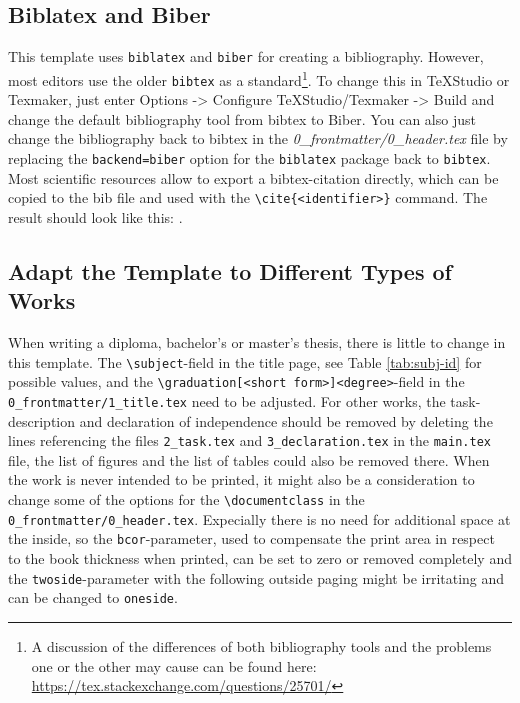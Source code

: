 \subsection{Biblatex and Biber}
This template uses \texttt{biblatex} and \texttt{biber} for creating a bibliography. However, most editors use the older \texttt{bibtex} as a standard\footnote{A discussion of the differences of both bibliography tools and the problems one or the other may cause can be found here: \url{https://tex.stackexchange.com/questions/25701/}}. To change this in TeXStudio or Texmaker, just enter Options -> Configure TeXStudio/Texmaker -> Build and change the default bibliography tool from bibtex to Biber. You can also just change the bibliography back to bibtex in the \emph{0\_frontmatter/0\_header.tex} file by replacing the \texttt{backend=biber} option for the \texttt{biblatex} package back to \texttt{bibtex}.
Most scientific resources allow to export a bibtex-citation directly, which can be copied to the bib file and used with the \texttt{\textbackslash cite\{<identifier>\}} command. The result should look like this: \cite{Foley1982}.

\subsection{Adapt the Template to Different Types of Works}
When writing a diploma, bachelor's or master's thesis, there is little to change in this template. The \texttt{\textbackslash{}subject{}}-field in the title page, see Table \ref{tab:subj-id} for possible values, and the \texttt{\textbackslash{}graduation[<short form>]{<degree>}}-field in the \texttt{0\_frontmatter/1\_title.tex} need to be adjusted. For other works, the task-description and declaration of independence should be removed by deleting the lines referencing the files \texttt{2\_task.tex} and \texttt{3\_declaration.tex} in the \texttt{main.tex} file, the list of figures and the list of tables could also be removed there. When the work is never intended to be printed, it might also be a consideration to change some of the options for the \texttt{\textbackslash{}documentclass} in the \texttt{0\_frontmatter/0\_header.tex}. Expecially there is no need for additional space at the inside, so the \texttt{bcor}-parameter, used to compensate the print area in respect to the book thickness when printed, can be set to zero or removed completely and the \texttt{twoside}-parameter with the following outside paging might be irritating and can be changed to \texttt{oneside}.

